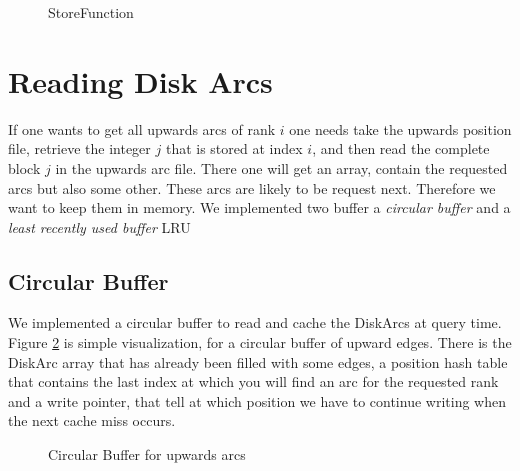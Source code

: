 \begin{figure}
    \centering
    
    \caption{StoreFunction}
    \label{fig:store_function}
\end{figure}

\section{Reading Disk Arcs}

If one wants to get all upwards arcs of rank $i$ one needs take  the upwards position file, retrieve the integer $j$ that is stored at index $i$, and then read the complete block $j$ in the upwards arc file. 
There one will get an array, contain the requested arcs but also some other. These arcs are likely to be request next. Therefore we want to keep them in memory. We implemented two buffer a \textit{circular buffer} and a \textit{least recently used buffer} LRU

\subsection{Circular Buffer}

We implemented a circular buffer to read and cache the DiskArcs at query time. Figure \ref{fig:circular} is simple visualization, for a circular buffer of upward edges. There is the DiskArc array that has already been filled with some edges, a position hash table that contains the last index at which you will find an arc for the requested rank and a write pointer, that tell at which position we have to continue writing when the next cache miss occurs.

\begin{figure}[H]
    \centering
    
    \caption{Circular Buffer for upwards arcs}
    \label{fig:circular}
\end{figure}


